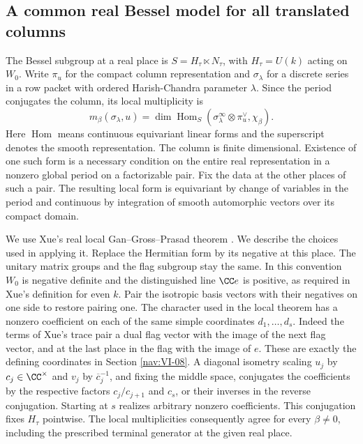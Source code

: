 \documentclass[a4paper,11pt]{article}
\theoremstyle{definition}
\theoremstyle{remark}
\numberwithin{equation}{section}
\begin{document}
\subsection{A common real Bessel model for all translated columns}\label{nav:VII-18}
The Bessel subgroup at a real place is \(S=H_\tau\ltimes N_\tau\),
with \(H_\tau=U(k)\) acting on \(W_0\). Write \(\pi_u\) for the
compact column representation and \(\sigma_\lambda\) for a discrete
series in a row packet with ordered Harish-Chandra parameter
\(\lambda\). Since the period conjugates the column, its local
multiplicity is
\[
 m_\beta(\sigma_\lambda,u)=\dim\operatorname{Hom}_{S}
      (\sigma_\lambda^\infty\otimes\pi_u^\vee,\chi_\beta).
\]
Here \(\operatorname{Hom}\) means continuous equivariant linear
forms and the superscript denotes the smooth representation.
The column is finite dimensional. Existence of one such form
is a necessary condition on the entire real representation in a
nonzero global period on a factorizable pair. Fix the data at
the other places of such a pair. The resulting local form is
equivariant by change of variables in the period and continuous
by integration of smooth automorphic vectors over its compact
domain.

We use Xue's real local Gan--Gross--Prasad theorem
\cite[Theorem 1.1]{XVII-XII-I-xue108}. We describe the choices used in
applying it. Replace the Hermitian form by its negative at this
place. The unitary matrix groups and the flag subgroup stay
the same. In this convention \(W_0\) is negative definite and
the distinguished line \(\CC e\) is positive, as required in
Xue's definition for even \(k\). Pair the isotropic basis vectors
with their negatives on one side to restore pairing one.
The character used in the local theorem has a nonzero coefficient
on each of the same simple coordinates \(d_1,\ldots,d_s\).
Indeed the terms of Xue's trace pair a dual flag vector with the
image of the next flag vector, and at the last place in the flag
with the image of \(e\). These are exactly the defining coordinates
in Section \ref{nav:VI-08}.
A diagonal isometry scaling \(u_j\) by \(c_j\in\CC^\times\) and
\(v_j\) by \(\overline c_j^{-1}\), and fixing the middle space,
conjugates the coefficients by the respective factors
\(c_j/c_{j+1}\) and \(c_s\), or their inverses in the reverse
conjugation. Starting at \(s\) realizes arbitrary nonzero
coefficients. This conjugation fixes \(H_\tau\) pointwise.
The local multiplicities consequently agree for every
\(\beta\ne0\), including the prescribed terminal generator at
the given real place.
\end{document}
